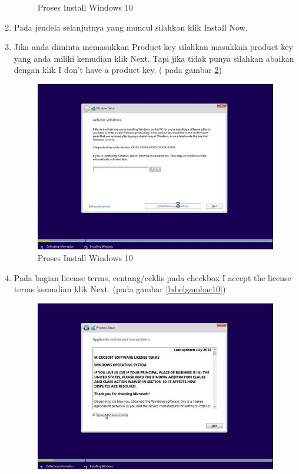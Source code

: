 \begin{enumerate}
\begin{figure}[h!]
	\caption{Proses Install Windows 10}
	\label{labelgambar8}
	\end{figure}
  \item Pada jendela selanjutnya yang muncul silahkan klik Install Now.
  \item Jika anda diminta memasukkan Product key silahkan masukkan product key yang anda miliki kemudian klik Next. Tapi jika tidak punya silahkan abaikan dengan klik I don’t have a product key. ( pada gambar \ref{labelgambar9})
      \begin{figure}[h!]
	\centering
	\includegraphics[scale=0.4]{figures/3.JPG}
	\caption{Proses Install Windows 10}
	\label{labelgambar9}
	\end{figure}
\item Pada bagian license terms, centang/ceklis pada checkbox I accept the license terms kemudian klik Next. (pada gambar \ref{labelgambar10})
    \begin{figure}[h!]
	\centering
	\includegraphics[scale=0.4]{figures/4.JPG}

\end{figure}
\end{enumerate}
